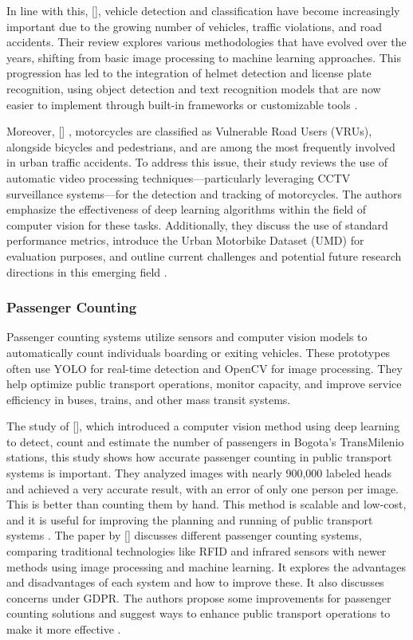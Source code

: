\begin{refsection}
In line with this,\citeauthor{Sanjana2021} [\citeyear{Sanjana2021}], vehicle detection and classification have become increasingly important due to the growing number of vehicles, traffic violations, and road accidents. Their review explores various methodologies that have evolved over the years, shifting from basic image processing to machine learning approaches. This progression has led to the integration of helmet detection and license plate recognition, using object detection and text recognition models that are now easier to implement through built-in frameworks or customizable tools \cite{Sanjana2021}.

Moreover, \citeauthor{Espinosa2021} [\citeyear{Espinosa2021}] , motorcycles are classified as Vulnerable Road Users (VRUs), alongside bicycles and pedestrians, and are among the most frequently involved in urban traffic accidents. To address this issue, their study reviews the use of automatic video processing techniques—particularly leveraging CCTV surveillance systems—for the detection and tracking of motorcycles. The authors emphasize the effectiveness of deep learning algorithms within the field of computer vision for these tasks. Additionally, they discuss the use of standard performance metrics, introduce the Urban Motorbike Dataset (UMD) for evaluation purposes, and outline current challenges and potential future research directions in this emerging field \cite{Espinosa2021}.

\subsubsection{Passenger Counting}
    Passenger counting systems utilize sensors and computer vision models to automatically count individuals boarding or exiting vehicles. These prototypes often use YOLO for real-time detection and OpenCV for image processing. They help optimize public transport operations, monitor capacity, and improve service efficiency in buses, trains, and other mass transit systems.

The study of \citeauthor{rendon2023passenger} [\citeyear{rendon2023passenger}], which introduced a computer vision method using deep learning to detect, count and estimate the number of passengers in Bogota's TransMilenio stations, this study shows how accurate passenger counting in public transport systems is important. They analyzed images with nearly 900,000 labeled heads and achieved a very accurate result, with an error of only one person per image. This is better than counting them by hand. This method is scalable and low-cost, and it is useful for improving the planning and running of public transport systems \cite{rendon2023passenger}. The paper by \citeauthor{radovan2024passenger} [\citeyear{radovan2024passenger}] discusses different passenger counting systems, comparing traditional technologies like RFID and infrared sensors with newer methods using image processing and machine learning. It explores the advantages and disadvantages of each system and how to improve these. It also discusses concerns under GDPR. The authors propose some improvements for passenger counting solutions and suggest ways to enhance public transport operations to make it more effective \cite{radovan2024passenger}.


\end{refsection}
